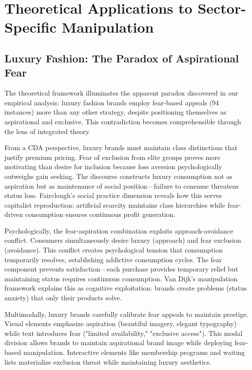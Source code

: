 
\section{Theoretical Applications to Sector-Specific Manipulation}
\label{sec:sector_applications}

\subsection{Luxury Fashion: The Paradox of Aspirational Fear}

The theoretical framework illuminates the apparent paradox discovered in our empirical analysis: luxury fashion brands employ fear-based appeals (94 instances) more than any other strategy, despite positioning themselves as aspirational and exclusive. This contradiction becomes comprehensible through the lens of integrated theory.

From a CDA perspective, luxury brands must maintain class distinctions that justify premium pricing. Fear of exclusion from elite groups proves more motivating than desire for inclusion because loss aversion psychologically outweighs gain seeking. The discourse constructs luxury consumption not as aspiration but as maintenance of social position—failure to consume threatens status loss. Fairclough's social practice dimension reveals how this serves capitalist reproduction: artificial scarcity maintains class hierarchies while fear-driven consumption ensures continuous profit generation.

Psychologically, the fear-aspiration combination exploits approach-avoidance conflict. Consumers simultaneously desire luxury (approach) and fear exclusion (avoidance). This conflict creates psychological tension that consumption temporarily resolves, establishing addictive consumption cycles. The fear component prevents satisfaction—each purchase provides temporary relief but maintaining status requires continuous consumption. Van Dijk's manipulation framework explains this as cognitive exploitation: brands create problems (status anxiety) that only their products solve.

Multimodally, luxury brands carefully calibrate fear appeals to maintain prestige. Visual elements emphasize aspiration (beautiful imagery, elegant typography) while text introduces fear ("limited availability," "exclusive access"). This modal division allows brands to maintain aspirational brand image while deploying fear-based manipulation. Interactive elements like membership programs and waiting lists materialize exclusion threat while maintaining luxury aesthetics.

